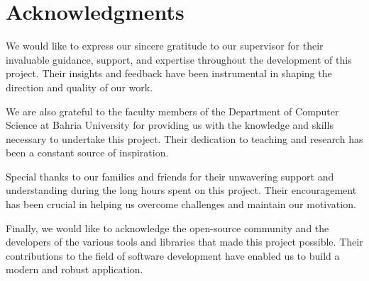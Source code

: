 \chapter*{Acknowledgments}

We would like to express our sincere gratitude to our supervisor for their invaluable guidance, support, and expertise throughout the development of this project. Their insights and feedback have been instrumental in shaping the direction and quality of our work.

We are also grateful to the faculty members of the Department of Computer Science at Bahria University for providing us with the knowledge and skills necessary to undertake this project. Their dedication to teaching and research has been a constant source of inspiration.

Special thanks to our families and friends for their unwavering support and understanding during the long hours spent on this project. Their encouragement has been crucial in helping us overcome challenges and maintain our motivation.

Finally, we would like to acknowledge the open-source community and the developers of the various tools and libraries that made this project possible. Their contributions to the field of software development have enabled us to build a modern and robust application. 